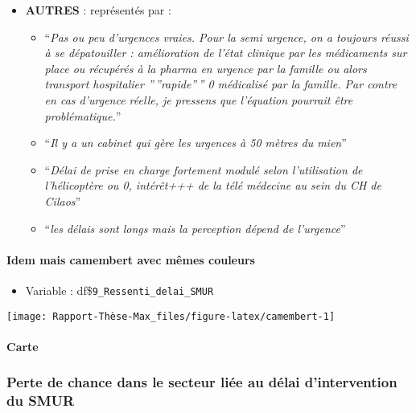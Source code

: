 \documentclass[
]{article}
\providecommand{\tightlist}{%
  \setlength{\itemsep}{0pt}\setlength{\parskip}{0pt}}
\begin{document}
\begin{itemize}
\item
  \textbf{AUTRES} : représentés par :

  \begin{itemize}
  \item
    ``\emph{Pas ou peu d'urgences vraies. Pour la semi urgence, on a
    toujours réussi à se dépatouiller : amélioration de l'état clinique
    par les médicaments sur place ou récupérés à la pharma en urgence
    par la famille ou alors transport hospitalier ''\,''rapide''\,'' 0
    médicalisé par la famille. Par contre en cas d'urgence réelle, je
    pressens que l'équation pourrait être problématique.}''
  \item
    ``\emph{Il y a un cabinet qui gère les urgences à 50 mètres du
    mien}''
  \item
    ``\emph{Délai de prise en charge fortement modulé selon
    l'utilisation de l'hélicoptère ou 0, intérêt+++ de la télé médecine
    au sein du CH de Cilaos}''
  \item
    ``\emph{les délais sont longs mais la perception dépend de
    l'urgence}''
  \end{itemize}
\end{itemize}

\paragraph{Idem mais camembert avec mêmes
couleurs}\label{idem-mais-camembert-avec-muxeames-couleurs}

\begin{itemize}
\tightlist
\item
  Variable : df\$\texttt{9\_Ressenti\_delai\_SMUR}
\end{itemize}

\begin{center}\texttt{[image: Rapport-Thèse-Max\_files/figure-latex/camembert-1]} \end{center}

\paragraph{Carte}\label{carte}

\subsubsection{Perte de chance dans le secteur liée au délai
d'intervention du
SMUR}\label{perte-de-chance-dans-le-secteur-liuxe9e-au-duxe9lai-dintervention-du-smur}
\end{document}
